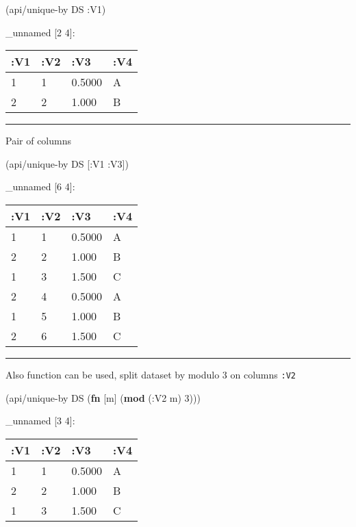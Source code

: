 \documentclass[]{article}
\newenvironment{Shaded}{\begin{snugshade}}{\end{snugshade}}
\newcommand{\KeywordTok}[1]{\textcolor[rgb]{0.13,0.29,0.53}{\textbf{#1}}}
\newcommand{\DecValTok}[1]{\textcolor[rgb]{0.00,0.00,0.81}{#1}}
\newcommand{\AttributeTok}[1]{\textcolor[rgb]{0.77,0.63,0.00}{#1}}
\newcommand{\NormalTok}[1]{#1}
\begin{document}
\begin{Shaded}
\begin{Highlighting}[]
\NormalTok{(api/unique-by DS }\AttributeTok{:V1}\NormalTok{)}
\end{Highlighting}
\end{Shaded}

\_unnamed {[}2 4{]}:

\begin{longtable}[]{@{}llll@{}}
\toprule
:V1 & :V2 & :V3 & :V4\tabularnewline
\midrule
\endhead
1 & 1 & 0.5000 & A\tabularnewline
2 & 2 & 1.000 & B\tabularnewline
\bottomrule
\end{longtable}

\begin{center}\rule{0.5\linewidth}{0.5pt}\end{center}

Pair of columns

\begin{Shaded}
\begin{Highlighting}[]
\NormalTok{(api/unique-by DS [}\AttributeTok{:V1} \AttributeTok{:V3}\NormalTok{])}
\end{Highlighting}
\end{Shaded}

\_unnamed {[}6 4{]}:

\begin{longtable}[]{@{}llll@{}}
\toprule
:V1 & :V2 & :V3 & :V4\tabularnewline
\midrule
\endhead
1 & 1 & 0.5000 & A\tabularnewline
2 & 2 & 1.000 & B\tabularnewline
1 & 3 & 1.500 & C\tabularnewline
2 & 4 & 0.5000 & A\tabularnewline
1 & 5 & 1.000 & B\tabularnewline
2 & 6 & 1.500 & C\tabularnewline
\bottomrule
\end{longtable}

\begin{center}\rule{0.5\linewidth}{0.5pt}\end{center}

Also function can be used, split dataset by modulo 3 on columns
\texttt{:V2}

\begin{Shaded}
\begin{Highlighting}[]
\NormalTok{(api/unique-by DS (}\KeywordTok{fn}\NormalTok{ [m] (}\KeywordTok{mod}\NormalTok{ (}\AttributeTok{:V2}\NormalTok{ m) }\DecValTok{3}\NormalTok{)))}
\end{Highlighting}
\end{Shaded}

\_unnamed {[}3 4{]}:

\begin{longtable}[]{@{}llll@{}}
\toprule
:V1 & :V2 & :V3 & :V4\tabularnewline
\midrule
\endhead
1 & 1 & 0.5000 & A\tabularnewline
2 & 2 & 1.000 & B\tabularnewline
1 & 3 & 1.500 & C\tabularnewline
\bottomrule
\end{longtable}
\end{document}
